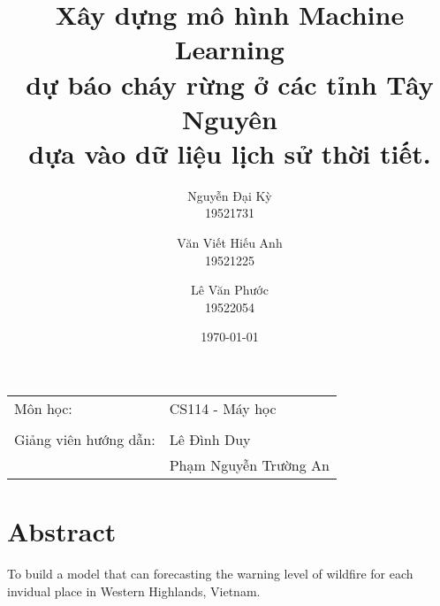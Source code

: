 \documentclass{article}
\begin{document}
\title{
      \LARGE{
            \textbf{
                  Xây dựng mô hình Machine Learning \\ dự báo cháy rừng ở các tỉnh Tây Nguyên \\ dựa vào dữ liệu lịch sử thời tiết.
            }
      }
}

\author{
      Nguyễn Đại Kỳ\\
      19521731\\
      \and
      Văn Viết Hiếu Anh\\
      19521225
      \and
      Lê Văn Phước\\
      19522054
}

\date{\today} %
\maketitle %
\begin{center}
      \begin{tabular}{l l}
            Môn học:              & CS114 - Máy học       \\
            \\
            Giảng viên hướng dẫn: & Lê Đình Duy           \\
                                  & Phạm Nguyễn Trường An \\
      \end{tabular}
\end{center}

\tableofcontents

\pagebreak


\section{Abstract}

To build a model that can forecasting the warning level of wildfire for each invidual place in Western Highlands, Vietnam.
\end{document}
